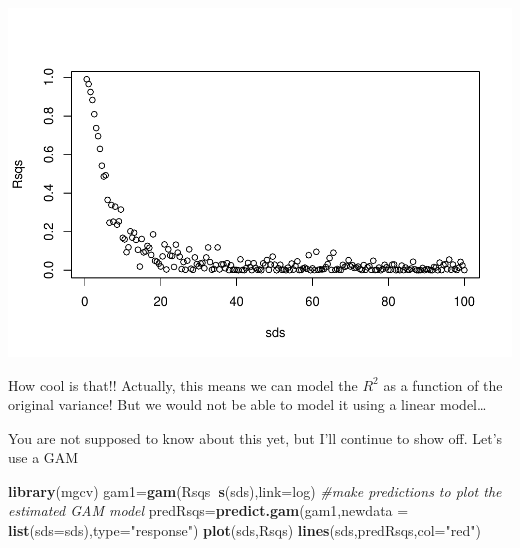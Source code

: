 \documentclass[
]{book}
\newenvironment{Shaded}{\begin{snugshade}}{\end{snugshade}}
\newcommand{\CommentTok}[1]{\textcolor[rgb]{0.56,0.35,0.01}{\textit{#1}}}
\newcommand{\ControlFlowTok}[1]{\textcolor[rgb]{0.13,0.29,0.53}{\textbf{#1}}}
\newcommand{\DataTypeTok}[1]{\textcolor[rgb]{0.13,0.29,0.53}{#1}}
\newcommand{\DecValTok}[1]{\textcolor[rgb]{0.00,0.00,0.81}{#1}}
\newcommand{\FloatTok}[1]{\textcolor[rgb]{0.00,0.00,0.81}{#1}}
\newcommand{\KeywordTok}[1]{\textcolor[rgb]{0.13,0.29,0.53}{\textbf{#1}}}
\newcommand{\NormalTok}[1]{#1}
\newcommand{\OperatorTok}[1]{\textcolor[rgb]{0.81,0.36,0.00}{\textbf{#1}}}
\newcommand{\StringTok}[1]{\textcolor[rgb]{0.31,0.60,0.02}{#1}}
\begin{document}
\begin{Shaded}
\end{Shaded}

\includegraphics{ECOMODbook_files/figure-latex/a6.31-1.pdf}

How cool is that!! Actually, this means we can model the \(R^2\) as a function of the original variance! But we would not be able to model it using a linear model\ldots{}

You are not supposed to know about this yet, but I'll continue to show off. Let's use a GAM

\begin{Shaded}
\begin{Highlighting}[]
\KeywordTok{library}\NormalTok{(mgcv)}
\NormalTok{gam1=}\KeywordTok{gam}\NormalTok{(Rsqs}\OperatorTok{~}\KeywordTok{s}\NormalTok{(sds),}\DataTypeTok{link=}\NormalTok{log)}
\CommentTok{#make predictions to plot the estimated GAM model}
\NormalTok{predRsqs=}\KeywordTok{predict.gam}\NormalTok{(gam1,}\DataTypeTok{newdata =} \KeywordTok{list}\NormalTok{(}\DataTypeTok{sds=}\NormalTok{sds),}\DataTypeTok{type=}\StringTok{"response"}\NormalTok{)}
\KeywordTok{plot}\NormalTok{(sds,Rsqs)}
\KeywordTok{lines}\NormalTok{(sds,predRsqs,}\DataTypeTok{col=}\StringTok{"red"}\NormalTok{)}
\end{Highlighting}
\end{Shaded}
\end{document}
